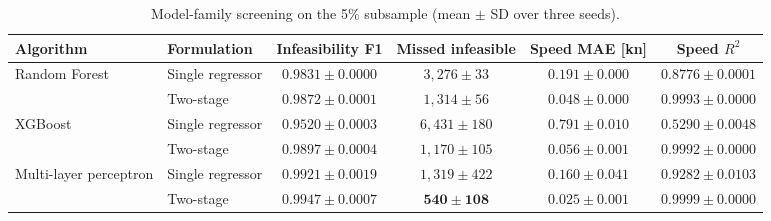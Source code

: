 \documentclass[final,5p,times,twocolumn,numbers]{elsarticle}
\begin{document}
\begin{table}[ht]
\footnotesize
\centering
\caption{Model-family screening on the 5\% subsample (mean $\pm$ SD over three seeds).}
\label{tab:algselect}
\begin{tabular}{llcccc}
\hline
Algorithm & Formulation & Infeasibility F1 & Missed infeasible & Speed MAE [kn] & Speed $R^2$ \\
\hline
Random Forest & Single regressor & $0.9831\pm0.0000$ & $3{,}276\pm33$ & $0.191\pm0.000$ & $0.8776\pm0.0001$ \\
 & Two-stage & $0.9872\pm0.0001$ & $1{,}314\pm56$ & $0.048\pm0.000$ & $0.9993\pm0.0000$ \\
XGBoost & Single regressor & $0.9520\pm0.0003$ & $6{,}431\pm180$ & $0.791\pm0.010$ & $0.5290\pm0.0048$ \\
 & Two-stage & $0.9897\pm0.0004$ & $1{,}170\pm105$ & $0.056\pm0.001$ & $0.9992\pm0.0000$ \\
Multi-layer perceptron & Single regressor & $0.9921\pm0.0019$ & $1{,}319\pm422$ & $0.160\pm0.041$ & $0.9282\pm0.0103$ \\
 & Two-stage & $\mathbf{0.9947\pm0.0007}$ & $\mathbf{540\pm108}$ & $\mathbf{0.025\pm0.001}$ & $\mathbf{0.9999\pm0.0000}$ \\
\hline
\end{tabular}
\end{table}
\end{document}
